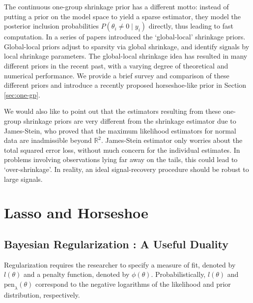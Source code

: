 \documentclass[11pt]{article}
\begin{document}
The continuous one-group shrinkage prior has a different motto: instead of
putting a prior on the model space to yield a sparse estimator, they model the
posterior inclusion probabilities $P(\theta_i \ne 0 \mid y_i)$ directly, thus
leading to fast computation. In a series of papers \citet{carvalho2009handling,
polson2010shrink, carvalho2010horseshoe, polson2012half} introduced the
`global-local' shrinkage priors. Global-local priors adjust to sparsity via
global shrinkage, and identify signals by local shrinkage parameters. The
global-local shrinkage idea has resulted in many different priors in the recent
past, with a varying degree of theoretical and numerical performance. We
provide a brief survey and comparison of these different priors and introduce a
recently proposed horseshoe-like prior in Section \ref{sec:one-gp}.   

We would also like to point out that the estimators resulting from these
one-group shrinkage priors are very different from the shrinkage estimator due
to James-Stein, who proved that the maximum likelihood estimators for normal
data are inadmissible beyond $\mathbb{R}^2$. James-Stein estimator only worries
about the total squared error loss, without much concern for the individual
estimates. In problems involving observations lying far away on the tails, this
could lead to `over-shrinkage'. In reality, an ideal signal-recovery procedure
should be robust to large signals.


\section{Lasso and Horseshoe}
\subsection{Bayesian Regularization : A Useful Duality}

Regularization requires the researcher to specify a measure of fit, denoted by $l(\theta)$ and a penalty function, denoted by $ \phi(\theta)$. Probabilistically,  $l(\theta)$ and $\text{pen}_{\lambda}(\theta)$ correspond to the negative logarithms of the likelihood and prior distribution, respectively.  
\end{document}
